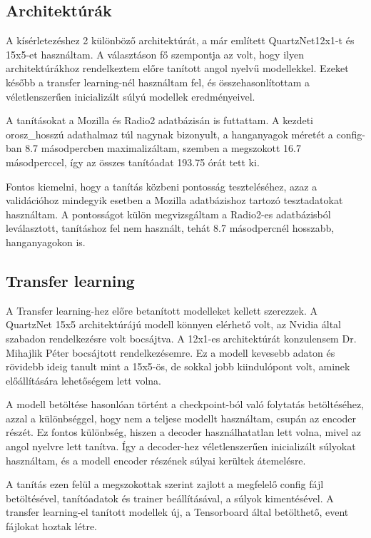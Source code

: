 \subsection{Architektúrák}

A kísérletezéshez 2 különböző architektúrát, a már említett QuartzNet12x1-t és 15x5-et használtam. A választáson fő szempontja az volt, hogy ilyen architektúrákhoz rendelkeztem előre tanított angol nyelvű modellekkel. Ezeket később a transfer learning-nél használtam fel, és összehasonlítottam a véletlenszerűen inicializált súlyú modellek eredményeivel.

A tanításokat a Mozilla és Radio2 adatbázisán is futtattam. A kezdeti orosz\_hosszú adathalmaz túl nagynak bizonyult, a hanganyagok méretét a config-ban 8.7 másodpercben maximalizáltam, szemben a megszokott 16.7 másodperccel, így az összes tanítóadat 193.75 órát tett ki.

Fontos kiemelni, hogy a tanítás közbeni pontosság teszteléséhez, azaz a validációhoz mindegyik esetben a Mozilla adatbázishoz tartozó tesztadatokat használtam. A pontosságot külön megvizsgáltam a Radio2-es adatbázisból leválasztott, tanításhoz fel nem használt, tehát 8.7 másodpercnél hosszabb, hanganyagokon is.

\subsection{Transfer learning}

A Transfer learning-hez előre betanított modelleket kellett szerezzek. A QuartzNet 15x5 architektúrájú modell könnyen elérhető volt, az Nvidia által szabadon rendelkezésre volt bocsájtva. A 12x1-es architektúrát konzulensem Dr. Mihajlik Péter bocsájtott rendelkezésemre. Ez a modell kevesebb adaton és rövidebb ideig tanult mint a 15x5-ös, de sokkal jobb kiindulópont volt, aminek előállítására lehetőségem lett volna.

A modell betöltése hasonlóan történt a checkpoint-ból való folytatás betöltéséhez, azzal a különbséggel, hogy nem a teljese modellt használtam, csupán az encoder részét. Ez fontos különbség, hiszen a decoder használhatatlan lett volna, mivel az angol nyelvre lett tanítva. Így a decoder-hez véletlenszerűen inicializált súlyokat használtam, és a modell encoder részének súlyai kerültek átemelésre.

A tanítás ezen felül a megszokottak szerint zajlott a megfelelő config fájl betöltésével, tanítóadatok és trainer beállításával, a súlyok kimentésével. A transfer learning-el tanított modellek új, a Tensorboard által betölthető, event fájlokat hoztak létre.